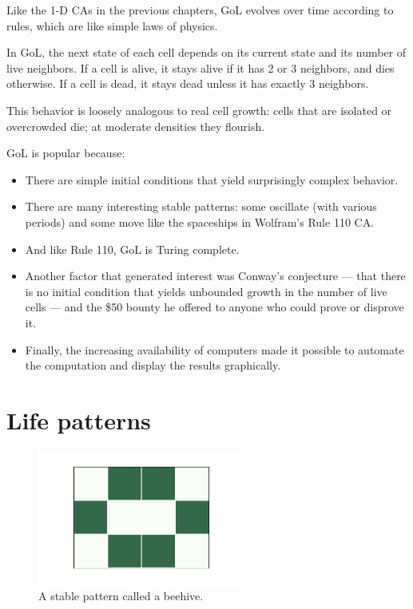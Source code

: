 \documentclass[12pt]{book}
\theoremstyle{exercise}
\begin{document}
Like the 1-D CAs in the previous chapters, GoL evolves over time according to rules, which are like simple laws of physics.

In GoL, the next state of each cell depends on its current state and
its number of live neighbors.  If a cell is alive, it stays alive if it
has 2 or 3 neighbors, and dies otherwise.  If a cell is
dead, it stays dead unless it has exactly 3 neighbors.

This behavior is loosely analogous to real cell growth: cells
that are isolated or overcrowded die; at moderate densities they
flourish.

GoL is popular because:

\begin{itemize}

\item There are simple initial conditions that yield
surprisingly complex behavior.


\item There are many interesting stable patterns: some
oscillate (with various periods) and some move like the
spaceships in Wolfram's Rule 110 CA.

\item And like Rule 110, GoL is Turing complete.


\item Another factor that generated interest was Conway's conjecture --- that there is no initial condition that yields unbounded growth in the number
of live cells --- and the \$50 bounty he offered to anyone who could prove
or disprove it.


\item Finally, the increasing availability of computers made it
  possible to automate the computation and display the results
  graphically.

\end{itemize}



\section{Life patterns}
\label{lifepatterns}

\begin{figure}
\centerline{\includegraphics[height=1.75in]{figs/chap06-1.pdf}}
\caption{A stable pattern called a beehive.}
\label{chap06-1}
\end{figure}
\end{document}
